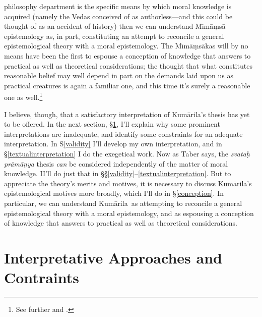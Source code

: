 \documentclass[11pt,letterpaper,oneside]{amsart}
\newcommand{\kum}{Kum\={a}rila}
\begin{document}
philosophy department is the specific means by which moral knowledge is acquired (namely the Vedas conceived of as authorless---and this could be thought of as an accident of history) then we can understand M\={\i}m\=a\d ms\=a epistemology as, in part, constituting an attempt to reconcile a general epistemological theory with a moral epistemology. The M\={\i}m\=a\d ms\=akas will by no means have been the first to espouse a conception of knowledge that answers to practical as well as theoretical considerations; the thought that what constitutes reasonable belief may well depend in part on the demands laid upon us as practical creatures is again a familiar one, and this time it's surely a reasonable one as well.\footnote{See further \citet{clooney1987vhn} and \citet{tabereternality}.}


I believe, though, that a satisfactory interpretation of \kum's thesis has yet to be offered. In the next section, \S\ref{interpreting}, I'll explain why some prominent interpretations are inadequate, and identify some constraints for an adequate interpretation. In S\ref{validity} I'll develop my own interpretation, and in \S\ref{textualinterpretation} I do the exegetical work. Now as Taber says, the \emph{svata\d h pr\=am\=a\d nya} thesis \emph{can} be considered independently of the matter of moral knowledge. II'll do just that in \S\S\ref{validity}--\ref{textualinterpretation}. But to appreciate the theory's merits and motives, it is necessary to discuss Kum\=arila's epistemological motives more broadly, which I'll do in \S\ref{conception}. In particular, we can understand \kum\ as attempting to reconcile a general epistemological theory with a moral epistemology, and as espousing a conception of knowledge that answers to practical as well as theoretical considerations. 



\section{Interpretative Approaches and Contraints}
\label{interpreting}
\end{document}

